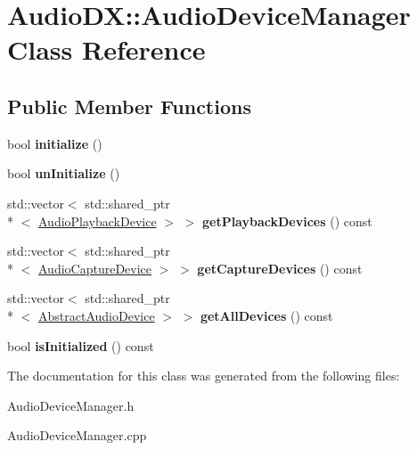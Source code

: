 \hypertarget{class_audio_d_x_1_1_audio_device_manager}{\section{Audio\-D\-X\-:\-:Audio\-Device\-Manager Class Reference}
\label{class_audio_d_x_1_1_audio_device_manager}
}
\subsection*{Public Member Functions}
\begin{DoxyCompactItemize}
\item 
\hypertarget{class_audio_d_x_1_1_audio_device_manager_abf9da36f8c05a6e21eb46a71e5370342}{bool {\bfseries initialize} ()}\label{class_audio_d_x_1_1_audio_device_manager_abf9da36f8c05a6e21eb46a71e5370342}

\item 
\hypertarget{class_audio_d_x_1_1_audio_device_manager_a16f6e3bad725b0cbcc412ad1d71c74fd}{bool {\bfseries un\-Initialize} ()}\label{class_audio_d_x_1_1_audio_device_manager_a16f6e3bad725b0cbcc412ad1d71c74fd}

\item 
\hypertarget{class_audio_d_x_1_1_audio_device_manager_ac28b6ccb55dd9298c87d3646551853f8}{std\-::vector$<$ std\-::shared\-\_\-ptr\\*
$<$ \hyperlink{class_audio_d_x_1_1_audio_playback_device}{Audio\-Playback\-Device} $>$ $>$ {\bfseries get\-Playback\-Devices} () const }\label{class_audio_d_x_1_1_audio_device_manager_ac28b6ccb55dd9298c87d3646551853f8}

\item 
\hypertarget{class_audio_d_x_1_1_audio_device_manager_a16ea9809c9a042ceeb0c29d39959862e}{std\-::vector$<$ std\-::shared\-\_\-ptr\\*
$<$ \hyperlink{class_audio_d_x_1_1_audio_capture_device}{Audio\-Capture\-Device} $>$ $>$ {\bfseries get\-Capture\-Devices} () const }\label{class_audio_d_x_1_1_audio_device_manager_a16ea9809c9a042ceeb0c29d39959862e}

\item 
\hypertarget{class_audio_d_x_1_1_audio_device_manager_a1cb22811ab6b73c1c0b4461870ec6f27}{std\-::vector$<$ std\-::shared\-\_\-ptr\\*
$<$ \hyperlink{class_audio_d_x_1_1_abstract_audio_device}{Abstract\-Audio\-Device} $>$ $>$ {\bfseries get\-All\-Devices} () const }\label{class_audio_d_x_1_1_audio_device_manager_a1cb22811ab6b73c1c0b4461870ec6f27}

\item 
\hypertarget{class_audio_d_x_1_1_audio_device_manager_aa9f75198d5d0b9442a31cf7006f3bab2}{bool {\bfseries is\-Initialized} () const }\label{class_audio_d_x_1_1_audio_device_manager_aa9f75198d5d0b9442a31cf7006f3bab2}

\end{DoxyCompactItemize}


The documentation for this class was generated from the following files\-:\begin{DoxyCompactItemize}
\item 
Audio\-Device\-Manager.\-h\item 
Audio\-Device\-Manager.\-cpp\end{DoxyCompactItemize}
